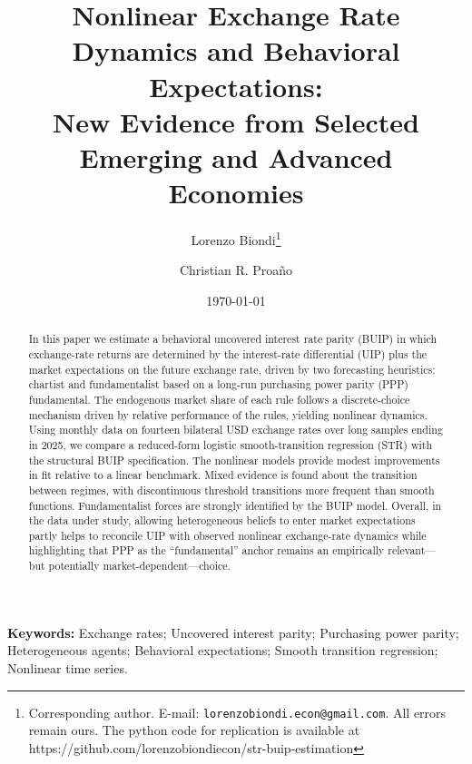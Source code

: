 \documentclass[a4paper,10pt,final]{article}    %
\begin{document}
\title{\large \bf Nonlinear Exchange Rate Dynamics and Behavioral Expectations: \\ New Evidence from Selected Emerging and Advanced Economies}

\author[a]{Lorenzo Biondi\thanks{Corresponding author. E-mail: {\tt lorenzobiondi.econ@gmail.com}. All errors remain ours. \newline The python code for replication is available at https://github.com/lorenzobiondiecon/str-buip-estimation}}
\author[b,c]{Christian R. Proa\~no}
\date{\today}
\maketitle

\begin{abstract}
    \noindent
    In this paper we estimate a behavioral uncovered interest rate parity (BUIP) in which exchange-rate returns are determined by the interest-rate differential (UIP) plus the market expectations on the future exchange rate, driven by two forecasting heuristics: chartist and fundamentalist based on a long-run purchasing power parity (PPP) fundamental. The endogenous market share of each rule follows a discrete-choice mechanism driven by relative performance of the rules, yielding nonlinear dynamics. Using monthly data on fourteen bilateral USD exchange rates over long samples ending in 2025, we compare a reduced-form logistic smooth-transition regression (STR) with the structural BUIP specification. The nonlinear models provide modest improvements in fit relative to a linear benchmark. Mixed evidence is found about the transition between regimes, with discontinuous threshold transitions more frequent than smooth functions. Fundamentalist forces are strongly identified by the BUIP model. Overall, in the data under study, allowing heterogeneous beliefs to enter market expectations partly helps to reconcile UIP with observed nonlinear exchange-rate dynamics while highlighting that PPP as the ``fundamental'' anchor remains an empirically relevant—but potentially market-dependent—choice.
\end{abstract}

\noindent \textbf{Keywords:} Exchange rates; Uncovered interest parity; Purchasing power parity; Heterogeneous agents; Behavioral expectations; Smooth transition regression; Nonlinear time series.
\end{document}
